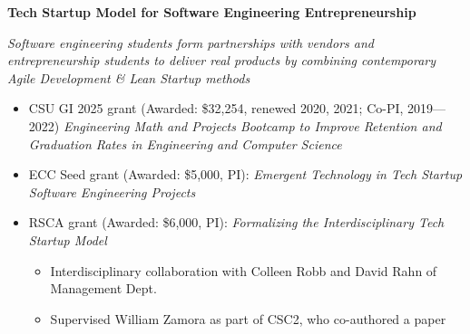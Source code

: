 \documentclass[10pt,letterpaper]{article}
\begin{document}
\par \textbf{Tech Startup Model for Software Engineering Entrepreneurship}\par
\par \emph{Software engineering students form partnerships with vendors and entrepreneurship students to deliver real products by combining contemporary Agile Development \& Lean Startup methods}\par
\begin{itemize}[leftmargin=1.5em]
\item CSU GI 2025 grant (Awarded: \$32,254, renewed 2020, 2021; Co-PI, 2019---2022) \textit{Engineering Math and Projects Bootcamp to Improve Retention and Graduation Rates in Engineering and Computer Science}
\item ECC Seed grant (Awarded: \$5,000, PI): \textit{Emergent Technology in Tech Startup Software Engineering Projects}
\item RSCA grant (Awarded: \$6,000, PI): \textit{Formalizing the Interdisciplinary Tech Startup Model}
\begin{itemize}[leftmargin=1.5em]
\item Interdisciplinary collaboration with Colleen Robb and David Rahn of Management Dept.
\item Supervised William Zamora as part of CSC2, who co-authored a paper
\end{itemize}
\end{itemize}
\end{document}
